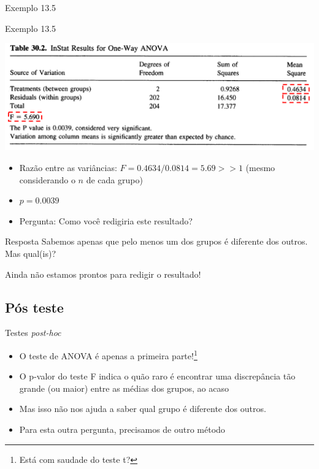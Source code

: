 \documentclass{beamer}
\begin{document}
\begin{frame}{\small Exemplo 13.5}
  \begin{exampleblock}{Exemplo 13.5}
    \begin{center}
      \includegraphics[width=.6\textwidth]{Cap13-30/exemplo13_5-3}
    \end{center}
  \begin{itemize}
  \item Razão entre as variâncias: $F = 0.4634/0.0814 = 5.69 >> 1$ {\tiny (mesmo considerando o $n$ de cada grupo)}
  \item $p=0.0039$
  \item Pergunta:  Como você redigiria este resultado?
  \end{itemize}
  \end{exampleblock}
\end{frame}

\begin{frame}{}
  \begin{block}{Resposta}
    Sabemos apenas que pelo menos um dos grupos é diferente dos outros.
    Mas qual(is)?

    \bigskip
    Ainda não estamos prontos para redigir o resultado!
  \end{block}
\end{frame}

\subsection{Pós teste}

\begin{frame}{Testes {\em post-hoc}}
  \begin{itemize}
  \item O teste de ANOVA é apenas a primeira parte!\footnote{Está com saudade do teste t?}
  \item O p-valor do teste F indica o quão raro é encontrar uma discrepância tão grande (ou maior) entre as médias dos grupos, ao acaso
  \item Mas isso não nos ajuda a saber qual grupo é diferente dos outros.
  \item Para esta outra pergunta, precisamos de outro método
  \end{itemize}
\end{frame}
\end{document}
